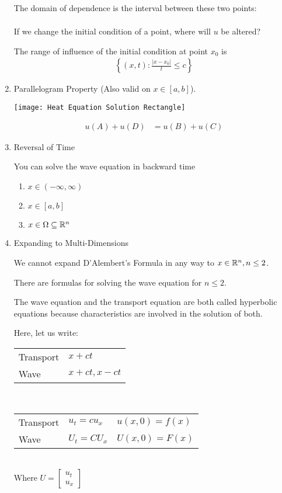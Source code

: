 \begin{enumerate}
  The domain of dependence is the interval between these two points:
  \begin{align}
    [x_0 - ct_0, x_0 + ct_0]
  \end{align}

  If we change the initial condition of a point, where will $u$ be altered?

  The range of influence of the initial condition at point $x_0$ is
  \begin{align}
    \left\{ (x, t) : \frac{| x - x_0|}{t} \leq c \right\}
  \end{align}
  \item Parallelogram Property (Also valid on $x \in [a, b]$).
  \begin{center}
    \texttt{[image: Heat Equation Solution Rectangle]}
  \end{center}
  \begin{align}
    u(A) + u(D) & = u(B) + u(C)
  \end{align}

  \item Reversal of Time

  You can solve the wave equation in backward time
  \begin{enumerate}
    \item $x \in (-\infty, \infty)$
    \item $x \in [a, b]$
    \item $x \in \Omega \subseteq \mathbb R^n$
  \end{enumerate}

  \item Expanding to Multi-Dimensions

  We cannot expand D'Alembert's Formula in any way to $x \in \mathbb R^n, n \leq 2$.

  There are formulas for solving the wave equation for $n \leq 2$.

  The wave equation and the transport equation are both called hyperbolic equations because characteristics are involved in the solution of both.

  Here, let us write:
  \begin{center}
    \begin{tabular}{l|l}
      Transport & $x + ct$\\
      Wave & $x + ct, x - ct$
    \end{tabular}\\
    \smallbreak
    \begin{tabular}{l|ll}
      Transport & $u_t = cu_x$ & $u(x, 0) = f(x)$\\
      Wave & $U_t = CU_x$ & $U(x, 0) = F(x)$
    \end{tabular}\\
    Where $U =
    \begin{bmatrix}
      u_t\\
      u_x
    \end{bmatrix}
    $
  \end{center}


\end{enumerate}
